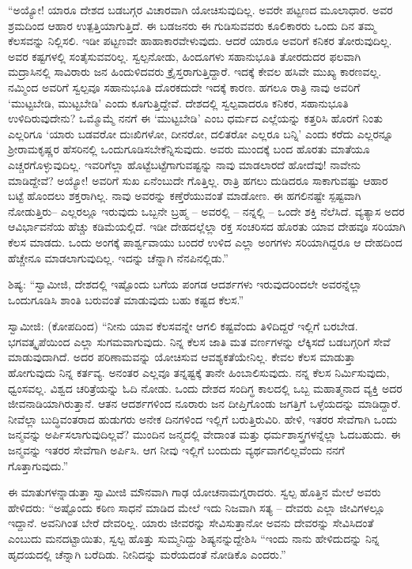  “ಅಯ್ಯೋ! ಯಾರೂ ದೇಶದ ಬಡಬಗ್ಗರ ವಿಚಾರವಾಗಿ ಯೋಚಿಸುವುದಿಲ್ಲ. ಅವರೇ ಪಟ್ಟಣದ ಮೂಲಾಧಾರ. ಅವರ ಶ್ರಮದಿಂದ ಆಹಾರ ಉತ್ಪತ್ತಿಯಾಗುತ್ತಿದೆ. ಈ ಬಡಜನರು ಈ ಗುಡಿಸುವವರು ಕೂಲಿಕಾರರು ಒಂದು ದಿನ ತಮ್ಮ ಕೆಲಸವನ್ನು ನಿಲ್ಲಿಸಲಿ. ಇಡೀ ಪಟ್ಟಣವೇ ಹಾಹಾಕಾರವೇಳುವುದು. ಆದರೆ ಯಾರೂ ಅವರಿಗೆ ಕನಿಕರ ತೋರುವುದಿಲ್ಲ. ಅವರ ಕಷ್ಟಗಳಲ್ಲಿ ಸಂತೈಸುವವರಿಲ್ಲ. ಸ್ವಲ್ಪನೋಡು, ಹಿಂದೂಗಳು ಸಹಾನುಭೂತಿ ತೋರದುದರ ಫಲವಾಗಿ ಮದ್ರಾಸಿನಲ್ಲಿ ಸಾವಿರಾರು ಜನ ಹಿಂದುಳಿದವರು ಕ್ರೈಸ್ತರಾಗುತ್ತಿದ್ದಾರೆ. ಇದಕ್ಕೆ ಕೇವಲ ಹಸಿವೇ ಮುಖ್ಯ ಕಾರಣವಲ್ಲ. ನಮ್ಮಿಂದ ಅವರಿಗೆ ಸ್ವಲ್ಪವೂ ಸಹಾನುಭೂತಿ ದೊರಕದುದೇ ಇದಕ್ಕೆ ಕಾರಣ. ಹಗಲೂ ರಾತ್ರಿ ನಾವು ಅವರಿಗೆ ‘ಮುಟ್ಟಬೇಡಿ, ಮುಟ್ಟಬೇಡಿ’ ಎಂದು ಕೂಗುತ್ತಿದ್ದೇವೆ. ದೇಶದಲ್ಲಿ ಸ್ವಲ್ಪವಾದರೂ ಕನಿಕರ, ಸಹಾನುಭೂತಿ ಉಳಿದಿರುವುದೇನು? ಒಮ್ಮೊಮ್ಮೆ ನನಗೆ ಈ ‘ಮುಟ್ಟಬೇಡಿ’ ಎಂಬ ಧರ್ಮದ ಎಲ್ಲೆಯನ್ನು ಕತ್ತರಿಸಿ ಹೊರಗೆ ನಿಂತು ಎಲ್ಲರಿಗೂ ‘ಯಾರು ಬಡವರೋ ದುಃಖಿಗಳೋ, ದೀನರೋ, ದಲಿತರೋ ಎಲ್ಲರೂ ಬನ್ನಿ’ ಎಂದು ಕರೆದು ಎಲ್ಲರನ್ನೂ ಶ‍್ರೀರಾಮಕೃಷ್ಣರ ಹೆಸರಿನಲ್ಲಿ ಒಂದುಗೂಡಿಸಬೇಕೆನ್ನಿಸುವುದು. ಅವರು ಮುಂದಕ್ಕೆ ಬಂದ ಹೊರತು ಮಾತೆಯೂ ಎಚ್ಚರಗೊಳ್ಳುವುದಿಲ್ಲ. ಇವರಿಗೆಲ್ಲಾ ಹೊಟ್ಟೆಬಟ್ಟೆಗಾಗುವಷ್ಟನ್ನು ನಾವು ಮಾಡಲಾರದೆ ಹೋದೆವು‌! ನಾವೇನು ಮಾಡಿದ್ದೇವೆ? ಅಯ್ಯೋ! ಅವರಿಗೆ ಸುಖ ಏನೆಂಬುದೇ ಗೊತ್ತಿಲ್ಲ. ರಾತ್ರಿ ಹಗಲು ದುಡಿದರೂ ಸಾಕಾಗುವಷ್ಟು ಆಹಾರ ಬಟ್ಟೆ ಹೊಂದಲು ಶಕ್ತರಾಗಿಲ್ಲ. ನಾವು ಅವರನ್ನು ಕಣ್ತೆರೆಯುವಂತೆ ಮಾಡೋಣ. ಈ ಹಗಲಿನಷ್ಟೇ ಸ್ಪಷ್ಟವಾಗಿ ನೋಡುತ್ತಿರು– ಎಲ್ಲರಲ್ಲೂ ಇರುವುದು ಒಬ್ಬನೇ ಬ್ರಹ್ಮ – ಅವರಲ್ಲಿ – ನನ್ನಲ್ಲಿ – ಒಂದೇ ಶಕ್ತಿ ನೆಲೆಸಿದೆ. ವ್ಯತ್ಯಾಸ ಅದರ ಆವಿರ್ಭಾವನೆಯ ಹೆಚ್ಚು ಕಡಿಮೆಯಲ್ಲಿದೆ. ಇಡೀ ದೇಹದಲ್ಲೆಲ್ಲಾ ರಕ್ತ ಸಂಚರಿಸದ ಹೊರತು ಯಾವ ದೇಹವೂ ಸರಿಯಾಗಿ ಕೆಲಸ ಮಾಡದು. ಒಂದು ಅಂಗಕ್ಕೆ ಪಾರ್ಶ್ವವಾಯು ಬಂದರೆ ಉಳಿದ ಎಲ್ಲಾ ಅಂಗಗಳು ಸರಿಯಾಗಿದ್ದರೂ ಆ ದೇಹದಿಂದ ಹೆಚ್ಚೇನೂ ಮಾಡಲಾಗುವುದಿಲ್ಲ. ಇದನ್ನು ಚೆನ್ನಾಗಿ ನೆನಪಿನಲ್ಲಿಡು.” 

 ಶಿಷ್ಯ: “ಸ್ವಾಮೀಜಿ, ದೇಶದಲ್ಲಿ ಇಷ್ಟೊಂದು ಬಗೆಯ ಪಂಗಡ ಆದರ್ಶಗಳು ಇರುವುದರಿಂದಲೇ ಅವರನ್ನೆಲ್ಲಾ ಒಂದುಗೂಡಿಸಿ ಶಾಂತಿ ಬರುವಂತೆ ಮಾಡುವುದು ಬಹು ಕಷ್ಟದ ಕೆಲಸ.” 

 ಸ್ವಾಮೀಜಿ: (ಕೋಪದಿಂದ) “ನೀನು ಯಾವ ಕೆಲಸವನ್ನೇ ಆಗಲಿ ಕಷ್ಟವೆಂದು ತಿಳಿದಿದ್ದರೆ ಇಲ್ಲಿಗೆ ಬರಬೇಡ. ಭಗವತ್ಕೃಪೆಯಿಂದ ಎಲ್ಲಾ ಸುಗಮವಾಗುವುದು. ನಿನ್ನ ಕೆಲಸ ಜಾತಿ ಮತ ವರ್ಣಗಳನ್ನು ಲೆಕ್ಕಿಸದೆ ಬಡಬಗ್ಗರಿಗೆ ಸೇವೆ ಮಾಡುವುದಾಗಿದೆ. ಅದರ ಪರಿಣಾಮವನ್ನು ಯೋಚಿಸುವ ಆವಶ್ಯಕತೆಯೇನಿಲ್ಲ. ಕೇವಲ ಕೆಲಸ ಮಾಡುತ್ತಾ ಹೋಗುವುದು ನಿನ್ನ ಕರ್ತವ್ಯ. ಅನಂತರ ಎಲ್ಲವೂ ತನ್ನಷ್ಟಕ್ಕೆ ತಾನೇ ಹಿಂಬಾಲಿಸುವುದು. ನನ್ನ ಕೆಲಸ ನಿರ್ಮಿಸುವುದು, ಧ್ವಂಸವಲ್ಲ. ವಿಶ್ವದ ಚರಿತ್ರೆಯನ್ನು ಓದಿ ನೋಡು. ಒಂದು ದೇಶದ ಸಂದಿಗ್ಧ ಕಾಲದಲ್ಲಿ ಒಬ್ಬ ಮಹಾತ್ಮನಾದ ವ್ಯಕ್ತಿ ಅದರ ಜೀವನಾಡಿಯಾಗಿರುತ್ತಾನೆ. ಆತನ ಆದರ್ಶಗಳಿಂದ ನೂರಾರು ಜನ ದೀಪ್ತಿಗೊಂಡು ಜಗತ್ತಿಗೆ ಒಳ್ಳೆಯದನ್ನು ಮಾಡಿದ್ದಾರೆ. ನೀವೆಲ್ಲಾ ಬುದ್ಧಿವಂತರಾದ ಹುಡುಗರು ಅನೇಕ ದಿನಗಳಿಂದ ಇಲ್ಲಿಗೆ ಬರುತ್ತಿರುವಿರಿ. ಹೇಳಿ, ಇತರರ ಸೇವೆಗಾಗಿ ಒಂದು ಜನ್ಮವನ್ನು ಅರ್ಪಿಸಲಾಗುವುದಿಲ್ಲವೆ? ಮುಂದಿನ ಜನ್ಮದಲ್ಲಿ ವೇದಾಂತ ಮತ್ತು ಧರ್ಮಶಾಸ್ತ್ರಗಳನ್ನೆಲ್ಲಾ ಓದಬಹುದು. ಈ ಜನ್ಮವನ್ನು ಇತರರ ಸೇವೆಗಾಗಿ ಅರ್ಪಿಸಿ. ಆಗ ನೀವು ಇಲ್ಲಿಗೆ ಬಂದುದು ವ್ಯರ್ಥವಾಗಲಿಲ್ಲವೆಂದು ನನಗೆ ಗೊತ್ತಾಗುವುದು.” 

 ಈ ಮಾತುಗಳನ್ನಾಡುತ್ತಾ ಸ್ವಾಮೀಜಿ ಮೌನವಾಗಿ ಗಾಢ ಯೋಚನಾಮಗ್ನರಾದರು. ಸ್ವಲ್ಪ ಹೊತ್ತಿನ ಮೇಲೆ ಅವರು ಹೇಳಿದರು: “ಅಷ್ಟೊಂದು ಕಠಿಣ ಸಾಧನೆ ಮಾಡಿದ ಮೇಲೆ ಇದು ನಿಜವಾಗಿ ಸತ್ಯ – ದೇವರು ಎಲ್ಲಾ ಜೀವಿಗಳಲ್ಲೂ ಇದ್ದಾನೆ. ಅವನಿಗಿಂತ ಬೇರೆ ದೇವರಿಲ್ಲ. ಯಾರು ಜೀವರನ್ನು ಸೇವಿಸುತ್ತಾನೋ ಅವನು ದೇವರನ್ನು ಸೇವಿಸಿದಂತೆ ಎಂಬುದು ಮನದಟ್ಟಾಯಿತು, ಸ್ವಲ್ಪ ಹೊತ್ತು ಸುಮ್ಮನಿದ್ದು ಶಿಷ್ಯನನ್ನುದ್ದೇಶಿಸಿ “ಇಂದು ನಾನು ಹೇಳಿದುದನ್ನು ನಿನ್ನ ಹೃದಯದಲ್ಲಿ ಚೆನ್ನಾಗಿ ಬರೆದಿಡು. ನೀನಿದನ್ನು ಮರೆಯದಂತೆ ನೋಡಿಕೊ ಎಂದರು.” 

